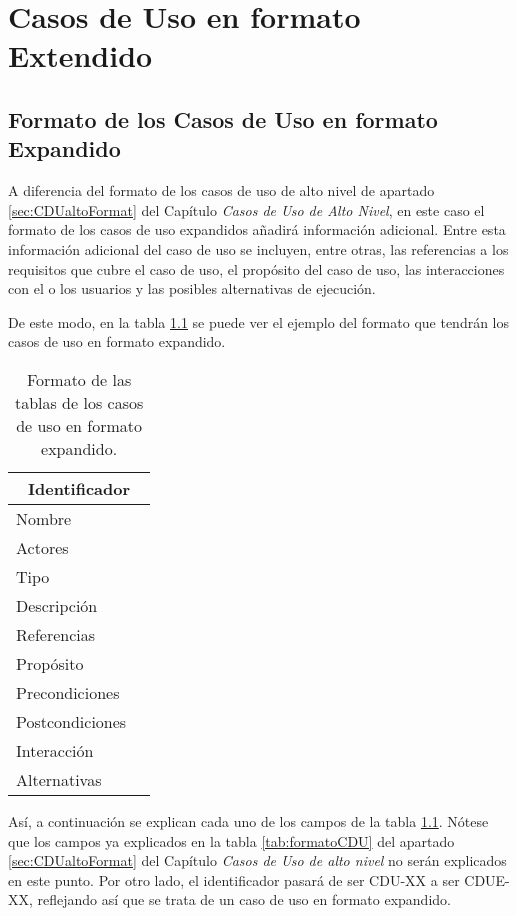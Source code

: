 \chapter{Casos de Uso en formato Extendido}
\section{Formato de los Casos de Uso en formato Expandido}
\par A diferencia del formato de los casos de uso de alto nivel de apartado \ref{sec:CDUaltoFormat} del Capítulo \textit{Casos de Uso de Alto Nivel}, en este caso el formato de los casos de uso expandidos añadirá información adicional. Entre esta información adicional del caso de uso se incluyen, entre otras, las referencias a los requisitos que cubre el caso de uso, el propósito del caso de uso, las interacciones con el o los usuarios y las posibles alternativas de ejecución.
\par De este modo, en la tabla \ref{tab:formatoCDUE} se puede ver el ejemplo del formato que tendrán los casos de uso en formato expandido.

\begin{table}[h]
\begin{center}
\begin{tabular}{p{} p{11cm}}
\multicolumn{2}{c}{\textbf{Identificador} } \\ \hline \hline
Nombre &  \\ \hline
Actores &  \\ \hline
Tipo & \\ \hline
Descripción &  \\ \hline
Referencias &  \\ \hline
Propósito &  \\ \hline
Precondiciones &  \\ \hline
Postcondiciones &  \\ \hline
Interacción &  \\ \hline
Alternativas &  \\ \hline
\end{tabular}
\caption{Formato de las tablas de los casos de uso en formato expandido.}
\label{tab:formatoCDUE}
\end{center}
\end{table}

\par Así, a continuación se explican cada uno de los campos de la tabla \ref{tab:formatoCDUE}. Nótese que los campos ya explicados en la tabla \ref{tab:formatoCDU} del apartado \ref{sec:CDUaltoFormat} del Capítulo \textit{Casos de Uso de alto nivel} no serán explicados en este punto. Por otro lado, el identificador pasará de ser CDU-XX a ser CDUE-XX, reflejando así que se trata de un caso de uso en formato expandido.

